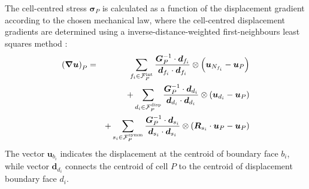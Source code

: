\documentclass[sn-mathphys,Numbered]{sn-jnl}%
\newcommand{\bb}{\boldsymbol}
\begin{document}
The cell-centred stress $\bb{\sigma}_P$ is calculated as a function of the displacement gradient according to the chosen mechanical law, where the cell-centred displacement gradients are determined using a inverse-distance-weighted first-neighbours least squares method \citep{Jasak1996}:
\begin{eqnarray} \label{eq:leastSquaresGrad}
	\left(\bb{\nabla}\bb{u}\right)_P
		&=&\sum_{f_i \in \mathcal{F}^{\text{int}}_P} \frac{\bb{G}^{-1}_P \cdot \bb{d}_{f_i}}{\bb{d}_{f_i} \cdot \bb{d}_{f_i}}  \otimes \left(\bb{u}_{N_{f_i}} - \bb{u}_P \right) \notag \\
		&&+ \sum_{d_i \in \mathcal{F}^{\text{disp}}_P} \frac{ \bb{G}^{-1}_P \cdot \bb{d}_{d_i} }{\bb{d}_{d_i} \cdot \bb{d}_{d_i}} \otimes \left(\bb{u}_{d_i} - \bb{u}_P \right) \notag \\
		&&+ \sum_{s_i \in \mathcal{F}^{\text{symm}}_P} \frac{\bb{G}^{-1}_P \cdot \bb{d}_{s_i}}{\bb{d}_{s_i} \cdot \bb{d}_{s_i}} \otimes \left(\bb{R}_{s_i} \cdot \bb{u}_P - \bb{u}_P \right)
\end{eqnarray}
The vector $\bb{u}_{b_i}$ indicates the displacement at the centroid of boundary face ${b_i}$, while vector $\bb{d}_{d_i}$ connects the centroid of cell $P$ to the centroid of displacement boundary face $d_i$.
\end{document}
